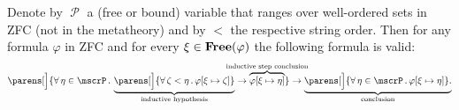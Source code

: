 \begin{theorem}\label{thm:well_ordered_induction}
  Denote by \( \mscrP \) a (free or bound) variable that ranges over well-ordered sets in ZFC (not in the metatheory) and by \( < \) the respective string order. Then for any formula \( \varphi \) in ZFC and for every \( \xi \in \operatorname{\mathbf{Free}}(\varphi) \) the following formula is valid:
  \begin{equation}\label{eq:thm:well_ordered_induction}
    \parens[\Big]
      {
        \qforall {\eta \in \mscrP}
          \underbrace
            {
              \parens[\Big] { \qforall {\zeta < \eta} \varphi[\xi \mapsto \zeta] }
            }_{\T{inductive hypothesis}}
        \rightarrow
        \overbrace{ \varphi[\xi \mapsto \eta] }^{\mathclap{\T{inductive step conclusion}}}
      }
    \rightarrow
    \underbrace
      {
        \parens[\Big]{ \qforall {\eta \in \mscrP} \varphi[\xi \mapsto \eta] }.
      }_{\T{conclusion}}
  \end{equation}
\end{theorem}
